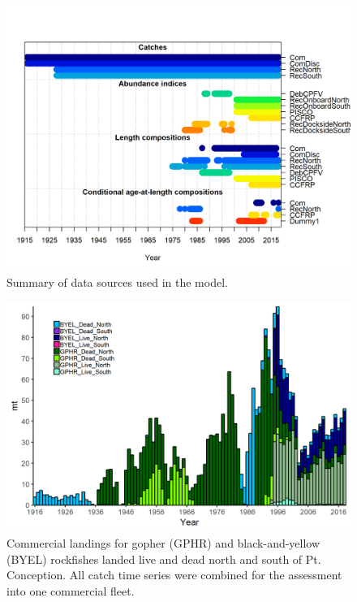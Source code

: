 \documentclass[12pt,]{article}
\begin{document}
\begin{figure}
\centering
\includegraphics{r4ss/plots_mod1/data_plot.png}
\caption{Summary of data sources used in the model.
\label{fig:data_plot}}
\end{figure}

\begin{figure}
\centering
\includegraphics{Figures/Catches_livedeadNS_gby.png}
\caption{Commercial landings for gopher (GPHR) and black-and-yellow
(BYEL) rockfishes landed live and dead north and south of Pt.
Conception. All catch time series were combined for the assessment into
one commercial fleet. \label{fig:Catches_livedeadNS_gby}}
\end{figure}
\end{document}

